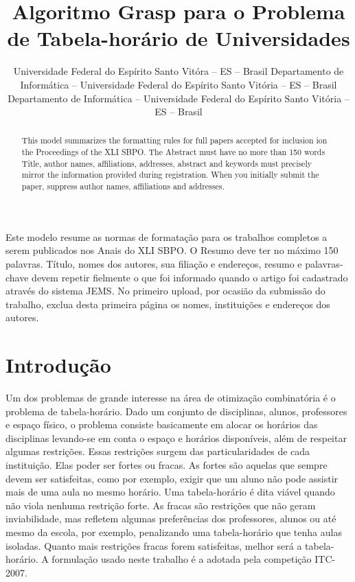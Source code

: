 \documentclass[11pt]{article}
\title{Algoritmo Grasp para o Problema de Tabela-horário de Universidades}
\author{\sbpoauthor{Walace S. Rocha}
                   {Universidade Federal do Espírito Santo}
                   {Vitóra -- ES -- Brasil}
                   {\email{walacesrocha@yahoo.com.br}}
        \sbpoauthor{Maria C. S. Boeres}
                   {Departamento de Informática -- Universidade Federal do Espírito Santo}
                   {Vitória -- ES -- Brasil}
                   {\email{boeres@inf.ufes.br}}
        \sbpoauthor{Maria C. Rangel}
                   {Departamento de Informática -- Universidade Federal do Espírito Santo}
                   {Vitória -- ES -- Brasil}
                   {\email{crangel@inf.ufes.br}}}
\begin{document}
 

\maketitle


\begin{resumo} 
  Este modelo resume as normas de formatação para os trabalhos completos a serem publicados nos Anais do XLI SBPO. O Resumo deve ter no máximo 150 palavras. Título, nomes dos autores, sua filiação e endereços, resumo e palavras-chave devem repetir fielmente o que foi informado quando o artigo foi cadastrado através do sistema JEMS. No primeiro upload, por ocasião da submissão do trabalho, exclua desta primeira página os nomes, instituições e endereços dos autores.
\end{resumo}


\begin{abstract}
  This model summarizes the formatting rules for full papers accepted for inclusion ion the Proceedings of the XLI SBPO. The Abstract must have no more than 150 words Title, author names, affiliations, addresses, abstract and keywords must precisely mirror the information provided during registration. When you initially submit the paper, suppress author names, affiliations and addresses.
\end{abstract}

\newpage
 
\section{Introdução}

Um dos problemas de grande interesse na área de otimização combinatória é o problema de tabela-horário. Dado um conjunto de disciplinas, alunos, professores e espaço físico, o problema consiste basicamente em alocar os horários das disciplinas levando-se em conta o espaço e horários disponíveis, além de respeitar algumas restrições. Essas restrições surgem das particularidades de cada instituição. Elas poder ser fortes ou fracas. As fortes são aquelas que sempre devem ser satisfeitas, como por exemplo, exigir que um aluno não pode assistir mais de uma aula no mesmo horário. Uma tabela-horário é dita viável quando não viola nenhuma restrição forte. As fracas são restrições que não geram inviabilidade, mas refletem algumas preferências dos professores, alunos ou até mesmo da escola, por exemplo, penalizando uma tabela-horário que tenha aulas isoladas. Quanto mais restrições fracas forem satisfeitas, melhor será a tabela-horário. A formulação usado neste trabalho é a adotada pela competição ITC-2007.
\end{document}
